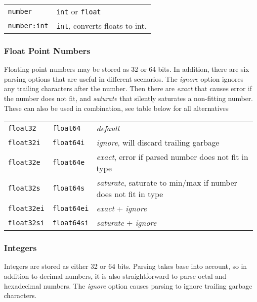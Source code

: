 \begin{tabular}{ll}
  \texttt{number}     & \texttt{int} or \texttt{float}\\
  \texttt{number:int} & \texttt{int}, converts floats to int.\\
\end{tabular}



\subsubsection{Float Point Numbers}
Floating point numbers may be stored as 32 or 64 bits.  In addition,
there are six parsing options that are useful in different scenarios.
The \emph{ignore} option ignores any trailing characters after the
number.  Then there are \emph{exact} that causes error if the number
does not fit, and \emph{saturate} that silently saturates a
non-fitting number.  These can also be used in combination, see table
below for all alternatives\\

\begin{tabular}{lll}
\texttt{float32} & \texttt{float64} & \emph{default}\\
\texttt{float32i} & \texttt{float64i} & \emph{ignore}, will discard trailing garbage\\
\texttt{float32e} & \texttt{float64e} & \emph{exact}, error if parsed number does not fit in type \\
\texttt{float32s} & \texttt{float64s} & \emph{saturate}, saturate to min/max if number does not fit in type \\
\texttt{float32ei} & \texttt{float64ei} & \emph{exact} + \emph{ignore} \\
\texttt{float32si} & \texttt{float64si} & \emph{saturate} + \emph{ignore} \\
\end{tabular}

\subsubsection{Integers}
Integers are stored as either 32 or 64 bits.  Parsing takes base into
account, so in addition to decimal numbers, it is also straightforward
to parse octal and hexadecimal numbers.  The \emph{ignore} option
causes parsing to ignore trailing garbage characters.\\


